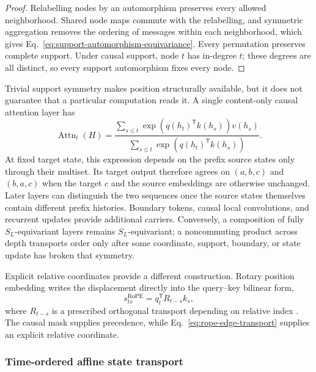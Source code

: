 \documentclass[10pt]{article}
\theoremstyle{definition}
\theoremstyle{remark}
\newcommand{\BookSubsection}[1]{\subsubsection{#1}}
\begin{document}
\begin{proof}
Relabelling nodes by an automorphism preserves every allowed neighborhood.  Shared node maps commute
with the relabelling, and symmetric aggregation removes the ordering of messages within each
neighborhood, which gives Eq.~\ref{eq:support-automorphism-equivariance}.  Every permutation preserves
complete support.  Under causal support, node $t$ has in-degree $t$; these degrees are all distinct,
so every support automorphism fixes every node.
\end{proof}

Trivial support symmetry makes position structurally available, but it does not guarantee that a
particular computation reads it.  A single content-only causal attention layer has
\begin{equation}
\operatorname{Attn}_t(H)
=\frac{\sum_{s\leq t}\exp(q(h_t)^{\mathsf T}k(h_s))v(h_s)}
{\sum_{s\leq t}\exp(q(h_t)^{\mathsf T}k(h_s))}.
\label{eq:nope-causal-multiset}
\end{equation}
At fixed target state, this expression depends on the prefix source states only through their
multiset.  Its target output therefore agrees on $(a,b,c)$ and $(b,a,c)$ when the target $c$ and the
source embeddings are otherwise unchanged.  Later layers can distinguish the two sequences once
the source states themselves contain different prefix histories.  Boundary tokens, causal local
convolutions, and recurrent updates provide additional carriers.  Conversely, a composition of
fully $S_L$-equivariant layers remains $S_L$-equivariant; a noncommuting product across depth
transports order only after some coordinate, support, boundary, or state update has broken that
symmetry.

Explicit relative coordinates provide a different construction.  Rotary position embedding writes
the displacement directly into the query--key bilinear form,
\begin{equation}
s_{t s}^{\mathrm{RoPE}}
=q_t^{\mathsf T}R_{t-s}k_s,
\label{eq:rope-edge-transport}
\end{equation}
where $R_{t-s}$ is a prescribed orthogonal transport depending on relative index
\cite{su2024roformer}.  The causal mask supplies precedence, while Eq.~\ref{eq:rope-edge-transport}
supplies an explicit relative coordinate.

\BookSubsection{Time-ordered affine state transport}
\end{document}
